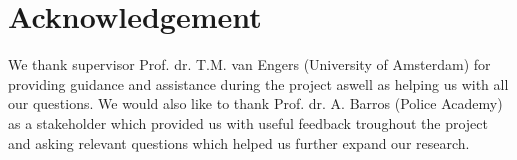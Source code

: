 \section {Acknowledgement}

We thank supervisor Prof. dr. T.M. van Engers (University of Amsterdam) for providing guidance and assistance during the project aswell as helping us with all our questions. We would also like to thank Prof. dr. A. Barros (Police Academy) as a stakeholder which provided us with useful feedback troughout the project and asking relevant questions which helped us further expand our research.